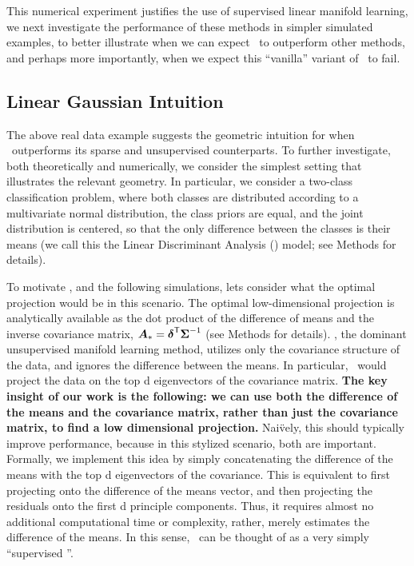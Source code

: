 \documentclass[10pt]{article}
\begin{document}
This numerical experiment justifies the use of supervised linear manifold learning, we next investigate the performance of these methods in simpler simulated examples, to better illustrate when we can expect \Lol~to outperform other methods, and perhaps more importantly, when we expect this ``vanilla'' variant of \Lol~to fail.

\subsection*{Linear Gaussian Intuition}

The above real data example suggests the geometric intuition for when \Lol~outperforms its sparse and unsupervised counterparts.  To further investigate, both theoretically and numerically, we consider the simplest setting that illustrates the relevant geometry.  In particular, we consider a two-class classification problem, where both classes are distributed according to a multivariate normal distribution, the class priors are equal, and the joint distribution is centered, so that the only difference between the classes is their means (we call this the Linear Discriminant Analysis (\Lda) model; see Methods for details).  




To motivate \Lol, and the following simulations, lets consider what the optimal projection would be in this scenario. The optimal low-dimensional projection is analytically available as the dot product of the difference of means and the inverse covariance matrix, $\boldsymbol{A}_*=\boldsymbol{\delta}^{\mathsf{T}} \boldsymbol{\Sigma}^{-1}$ \cite{Bickel2004a} (see Methods for details).  
\Pca, the dominant unsupervised manifold learning method, utilizes only the covariance structure of the data, and ignores the difference between the means.  
In particular, \Pca~would project the data on the top d eigenvectors of the  covariance matrix.
\textbf{The key insight of our work is the following: we can use both the difference of the means and the covariance matrix, rather than just the covariance matrix, to find a low dimensional projection.}  
Nai\"vely, this should typically improve performance, because in this stylized scenario, both are important.  Formally, we implement this idea by simply concatenating the difference of the means with the top d eigenvectors of the  covariance. 
This is equivalent to first projecting onto the difference of the means vector, and then projecting the residuals onto the first d principle components. 
Thus, it requires almost no additional computational time or complexity, rather, merely estimates the difference of the means.  
In this sense, \Lol~can be thought of as a very simply  ``supervised \Pca''.  
\end{document}
